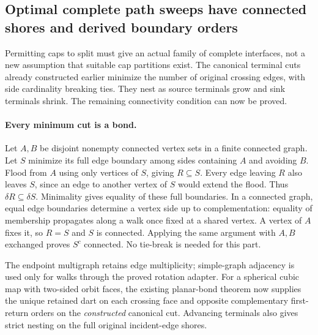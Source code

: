 \subsection{Optimal complete path sweeps have connected shores and derived boundary orders}
\label{sec:canonical-terminal-bonds}

Permitting caps to split must give an actual family of complete
interfaces, not a new assumption that suitable cap partitions exist.
The canonical terminal cuts already constructed earlier minimize the
number of original crossing edges, with side cardinality breaking ties.
They nest as source terminals grow and sink terminals shrink. The
remaining connectivity condition can now be proved.

\paragraph{Every minimum cut is a bond.}
Let $A,B$ be disjoint nonempty connected vertex sets in a finite connected
graph. Let $S$ minimize its full edge boundary among sides containing
$A$ and avoiding $B$. Flood from $A$ using only vertices of $S$, giving
$R\subseteq S$. Every edge leaving $R$ also leaves $S$, since an edge
to another vertex of $S$ would extend the flood. Thus
$\delta R\subseteq\delta S$. Minimality gives equality of these full
boundaries. In a connected graph, equal edge boundaries determine a
vertex side up to complementation: equality of membership propagates
along a walk once fixed at a shared vertex. A vertex of $A$ fixes it,
so $R=S$ and $S$ is connected. Applying the same argument with $A,B$
exchanged proves $S^c$ connected. No tie-break is needed for this part.

The endpoint multigraph retains edge multiplicity; simple-graph
adjacency is used only for walks through the proved rotation adapter.
For a spherical cubic map with two-sided orbit faces, the existing
planar-bond theorem now supplies the unique retained dart on each
crossing face and opposite complementary first-return orders on the
\emph{constructed} canonical cut. Advancing terminals also gives strict
nesting on the full original incident-edge shores.


